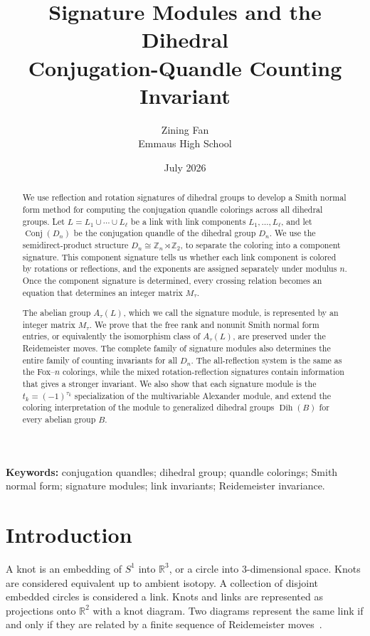 \documentclass[11pt]{article}
\title{Signature Modules and the Dihedral\\
Conjugation-Quandle Counting Invariant}
\author{Zining Fan\\Emmaus High School}
\date{July 2026}
\theoremstyle{definition}
\newcommand{\Z}{\mathbb{Z}}
\newcommand{\Conj}{\operatorname{Conj}}
\begin{document}
\maketitle

\begin{abstract}
We use reflection and rotation signatures of dihedral groups to develop a Smith normal form method for computing the conjugation quandle colorings across all dihedral groups. Let $L=L_1\cup\cdots\cup L_\ell$ be a link with link components $L_1,\ldots,L_\ell$, and let $\Conj(D_n)$ be the conjugation quandle of the dihedral group $D_n$. We use the semidirect-product structure $D_n\cong\Z_n\rtimes\Z_2$, to separate the coloring into a component signature. This component signature tells us whether each link component
is colored by rotations or reflections, and the exponents
are assigned separately under modulus $n$. Once the component signature is determined, every crossing relation becomes an equation that determines an integer matrix $M_\tau$.

The abelian group $A_\tau(L)$, which we call the signature module, is represented by an integer matrix $M_\tau$. We prove that the free rank and nonunit Smith normal form entries, or equivalently the isomorphism class of $A_\tau(L)$, are preserved under the Reidemeister moves. The complete family of signature modules also determines the entire family of counting invariants for all $D_n$. The all-reflection system is the same as the Fox--$n$ colorings, while the mixed rotation-reflection signatures contain information that gives a stronger invariant. We also show that each signature module is the $t_k=(-1)^{\tau_k}$ specialization of the multivariable
Alexander module, and extend the coloring interpretation of the module to generalized dihedral groups $\operatorname{Dih}(B)$
for every abelian group $B$.
\end{abstract}

\noindent\textbf{Keywords:} conjugation quandles; dihedral group; quandle colorings; Smith normal form; signature modules; link invariants; Reidemeister invariance.

\section{Introduction}

A knot is an embedding of $S^1$ into $\mathbb{R}^3$, or a circle into 3-dimensional space. Knots are considered equivalent up to ambient isotopy. A collection of disjoint embedded circles is considered a link. Knots and links are represented as projections onto $\mathbb{R}^2$ with a knot diagram. Two diagrams represent the same link if and only if they are related by a finite sequence of Reidemeister moves~\cite[pp.~1--4]{lickorish}.
\end{document}
